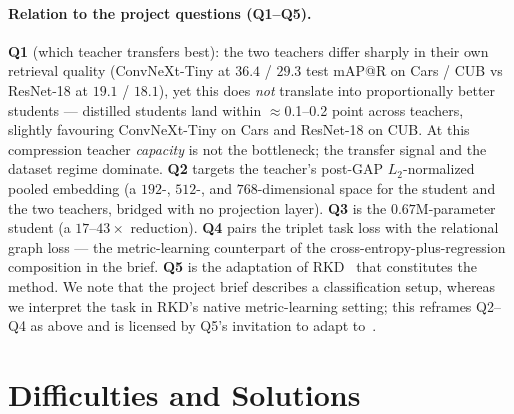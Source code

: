\documentclass[11pt,letterpaper]{article}
\begin{document}
\paragraph{Relation to the project questions (Q1--Q5).}
\textbf{Q1} (which teacher transfers best): the two teachers differ sharply in their own
retrieval quality (ConvNeXt-Tiny at $36.4$ / $29.3$ test mAP@R on Cars / CUB vs
ResNet-18 at $19.1$ / $18.1$), yet this does \emph{not} translate into proportionally
better students --- distilled students land within $\approx$0.1--0.2 point across
teachers, slightly favouring ConvNeXt-Tiny on Cars and ResNet-18 on CUB. At this
compression teacher \emph{capacity} is not the bottleneck; the transfer signal and the
dataset regime dominate. \textbf{Q2} targets the teacher's post-GAP $L_2$-normalized
pooled embedding (a $192$-, $512$-, and $768$-dimensional space for the student and the
two teachers, bridged with no projection layer). \textbf{Q3} is the $0.67$M-parameter
student (a $17$--$43\times$ reduction). \textbf{Q4} pairs the triplet task loss with the
relational graph loss --- the metric-learning counterpart of the
cross-entropy-plus-regression composition in the brief. \textbf{Q5} is the adaptation of
RKD~\cite{park2019relational} that constitutes the method. We note that the project brief
describes a classification setup, whereas we interpret the task in RKD's native
metric-learning setting; this reframes Q2--Q4 as above and is licensed by Q5's invitation
to adapt to~\cite{park2019relational}.

\section{Difficulties and Solutions}
\label{sec:difficulties}

\end{document}
